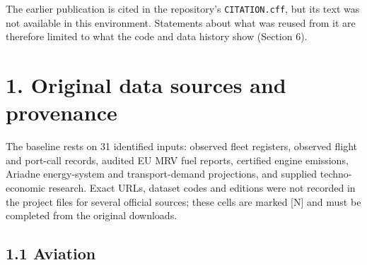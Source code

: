 \documentclass[11pt,a4paper]{article}
\begin{document}
The earlier publication \citep{khanra2025} is cited in the repository's \texttt{CITATION.\allowbreak{}cff}, but its text was not available in this environment. Statements about what was reused from it are therefore limited to what the code and data history show (Section 6).

\section*{1. Original data sources and provenance}

The baseline rests on 31 identified inputs: observed fleet registers, observed flight and port-call records, audited EU MRV fuel reports, certified engine emissions, Ariadne energy-system and transport-demand projections, and supplied techno-economic research. Exact URLs, dataset codes and editions were not recorded in the project files for several official sources; these cells are marked [N] and must be completed from the original downloads.

\subsection*{1.1 Aviation}
\end{document}
